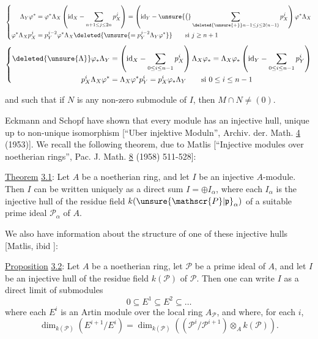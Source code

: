 \[
\left\{\begin{aligned}
 \Lambda_Y\varphi^*&=\varphi^*\Lambda_X\left(\mathrm{id}_X-\sum_{n+1\leq j\leq2n}p_X^j\right)
 =\left(\mathrm{id}_Y-\unsure{\bigl(}\sum_{\deleted{\unsure{+}}n-1\leq j\leq 2(n-1)}p_X^j\right)\varphi^*\Lambda_X\\
 \varphi^*\Lambda_Xp_X^j&=p_Y^{j-2}\varphi^*\Lambda_X\deleted{\unsure{=p_Y^{j-2}\Lambda_Y\varphi^*}}\qquad\text{si }j\geq n+1
\end{aligned}\right.
\]
\[
\left\{\begin{aligned}
 \deleted{\unsure{\Lambda}}\varphi_*\Lambda_Y&=\left(\mathrm{id}_X-\sum_{0\leq i\leq n-1}p_X^i\right)\Lambda_X\varphi_*=\Lambda_X\varphi_*\left(\mathrm{id}_Y-\sum_{0\leq i\leq n-1}p_Y^i\right)\\
 p_X^i\Lambda_X\varphi^*&=\Lambda_X\varphi^*p_Y^i=p_X^i\varphi_*\Lambda_Y\qquad\text{si }0\leq i\leq n-1
\end{aligned}\right.
\]

and such that if $N$ is any non-zero submodule of $I$, then $M\cap N\neq(0)$.

Eckmann and Schopf have shown that every module has an injective hull, unique up to non-unique isomorphism [``Uber injektive Moduln'', Archiv. der. Math. \uline{4} (1953)]. We recall the following theorem, due to Matlis [``Injective modules over noetherian rings'', Pac. J. Math. \uline{8} (1958) 511-528]:

\uline{Theorem} \uline{3.1}: Let $A$ be a noetherian ring, and let $I$ be an injective $A$-module. Then $I$ can be written uniquely as a direct sum $I=\oplus I_\alpha$, where each $I_\alpha$ is the injective hull of the residue field $k(\unsure{\mathscr{P}|\mathfrak{p}}_\alpha)$ of a suitable prime ideal $\mathscr{P}_\alpha$ of $A$.

We also have information about the structure of one of these injective hulls [Matlis, ibid ]:

\uline{Proposition} \uline{3.2}: Let $A$ be a noetherian ring, let $\mathscr{P}$ be a prime ideal of $A$, and let $I$ be an injective hull of the residue field $k(\mathscr{P})$ of $\mathscr{P}$. Then one can write $I$ as a direct limit of submodules
\[
0\subseteq E^1\subseteq E^2\subseteq\ldots
\]
where each $E^i$ is an Artin module over the local ring $A_{\mathscr{P}}$, and where, for each $i$,
\[
\dim_{k(\mathscr{P})}(E^{i+1}/E^i)=\dim_{k(\mathscr{P})}\left((\mathscr{P}^i/\mathscr{P}^{i+1})\otimes_A k(\mathscr{P})\right).
\]

